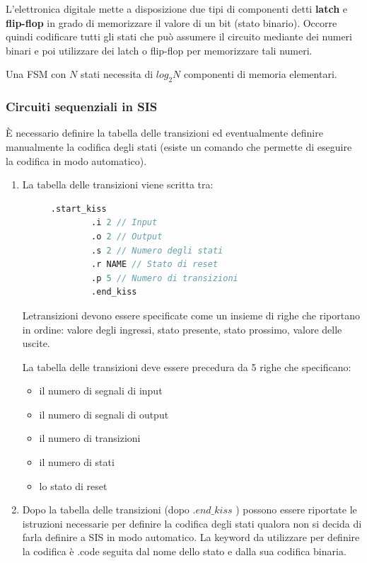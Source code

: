 \documentclass[a4paper]{article}
\theoremstyle{break}
\theoremstyle{break}
\theoremstyle{break}
\theoremstyle{break}
\begin{document}
L’elettronica digitale mette a disposizione due tipi di componenti detti
\textbf{latch} e \textbf{flip-flop} in grado di memorizzare il valore di un bit (stato binario).
Occorre quindi codificare tutti gli stati che può assumere il circuito
mediante dei numeri binari e poi utilizzare dei latch o flip-flop per
memorizzare tali numeri.

Una FSM con \( N \) stati necessita di \( log_2 N \) componenti di memoria elementari.

\subsubsection{Circuiti sequenziali in SIS}
È necessario definire la tabella delle transizioni ed eventualmente definire manualmente la 
codifica degli stati (esiste un comando che permette di eseguire la codifica in modo automatico).
\begin{enumerate}
  \item La tabella delle transizioni viene scritta tra:
    \begin{figure}[H]
      \begin{lstlisting}[language=Verilog]
        .start_kiss
        .i 2 // Input
        .o 2 // Output
        .s 2 // Numero degli stati
        .r NAME // Stato di reset
        .p 5 // Numero di transizioni 
        .end_kiss
      \end{lstlisting}
    \end{figure}
  Letransizioni devono essere specificate come un insieme di righe che
  riportano in ordine: valore degli ingressi, stato presente, stato
  prossimo, valore delle uscite.
  
  La tabella delle transizioni deve essere precedura da 5 righe che specificano:
  \begin{itemize}
    \item il numero di segnali di input
    \item il numero di segnali di output
    \item il numero di transizioni
    \item il numero di stati
    \item lo stato di reset
  \end{itemize}
  \item Dopo la tabella delle transizioni (dopo \( .end\_kiss \) ) possono essere
riportate le istruzioni necessarie per definire la codifica degli stati
qualora non si decida di farla definire a SIS in modo automatico. La
keyword da utilizzare per definire la codifica è .code seguita dal nome
dello stato e dalla sua codifica binaria.
\end{enumerate}
\end{document}
